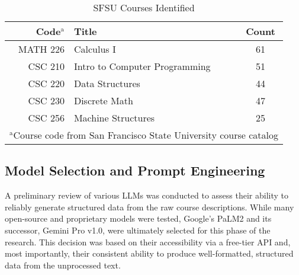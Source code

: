 \begin{table}[tb]
    \captionsetup{skip=5pt}
    \centering
    \caption{SFSU Courses Identified}
    \begin{tabular}{rlc}
        \toprule
        \textbf{Code$^{\mathrm{a}}$} & \textbf{Title}                & \textbf{Count} \\
        \midrule
        MATH 226                     & Calculus I
                                        & 61                                             \\
        CSC 210                      & Intro to Computer Programming
                                        & 51                                             \\
        CSC 220                      & Data Structures
                                        & 44                                             \\
        CSC 230                      & Discrete Math
                                        & 47                                             \\
        CSC 256                      & Machine Structures
                                        & 25                                             \\
        \bottomrule
        \multicolumn{3}{l}{$^{\mathrm{a}}$Course code from San Francisco
            State University course catalog}
    \end{tabular}
    \label{tbl:sfsucourses}
\end{table}

\subsection{Model Selection and Prompt Engineering}\label{ch:3.1.2}
A preliminary review of various LLMs was conducted to assess their ability to reliably generate structured data from the raw course descriptions. While many open-source and proprietary models were tested, Google's PaLM2 and its successor, Gemini Pro v1.0, were ultimately selected for this phase of the research. This decision was based on their accessibility via a free-tier API and, most importantly, their consistent ability to produce well-formatted, structured data from the unprocessed text.

